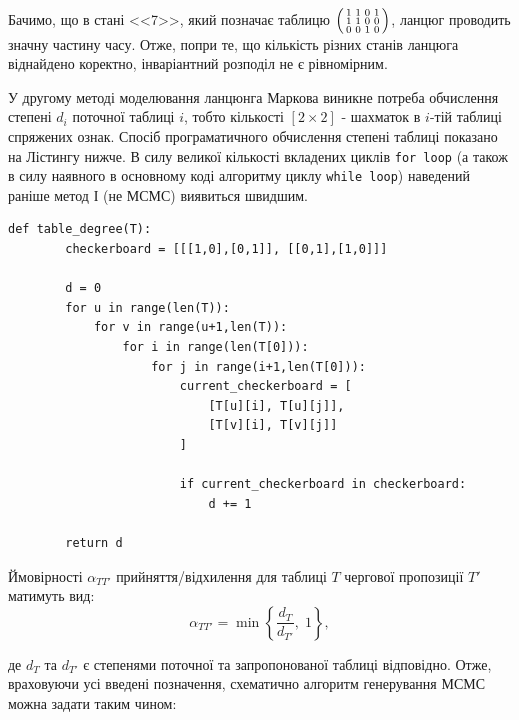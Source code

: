 \documentclass[a4paper,14pt]{extarticle} %
\numberwithin{equation}{section}
\begin{document}
Бачимо, що в стані <<7>>, який позначає таблицю $
\begin{psmallmatrix}
    1 & 1 & 0 & 1 \\
    1 & 1 & 0 & 0 \\
    0 & 0 & 1 & 0 \\
\end{psmallmatrix}
$, ланцюг проводить значну частину часу. Отже, попри те, що кількість різних станів ланцюга віднайдено коректно, інваріантний розподіл не є рівномірним.

У другому методі моделювання ланцюнга Маркова виникне потреба обчислення степені $d_i$ поточної таблиці $i$, тобто кількості $[2\times 2]$ - шахматок в $i$-тій таблиці спряжених ознак. Спосіб програматичного обчислення степені таблиці показано на Лістингу нижче. В силу великої кількості вкладених циклів \texttt{for loop} (а також в силу наявного в основному коді алгоритму циклу \texttt{while loop}) наведений раніше метод І (не МСМС) виявиться швидшим.

\begin{lstlisting}[firstnumber=1, caption = Функція визначення степені таблиці]
    def table_degree(T):
        checkerboard = [[[1,0],[0,1]], [[0,1],[1,0]]]

        d = 0
        for u in range(len(T)):
            for v in range(u+1,len(T)):
                for i in range(len(T[0])):
                    for j in range(i+1,len(T[0])):
                        current_checkerboard = [
                            [T[u][i], T[u][j]],
                            [T[v][i], T[v][j]]
                        ]

                        if current_checkerboard in checkerboard:
                            d += 1

        return d
\end{lstlisting}

\vspace{0.4cm}
Ймовірності $\alpha_{TT'}$ прийняття/відхилення для таблиці $T$ чергової пропозиції $T'$ матимуть вид:
\[ \alpha_{TT'}=\min\left\{ \frac{d_T}{d_{T'}}, \; 1 \right\},\]

де $d_T$ та $d_{T'}$ є степенями поточної та запропонованої таблиці відповідно. Отже, враховуючи усі введені позначення, схематично алгоритм генерування МСМС можна задати таким чином:
\end{document}
